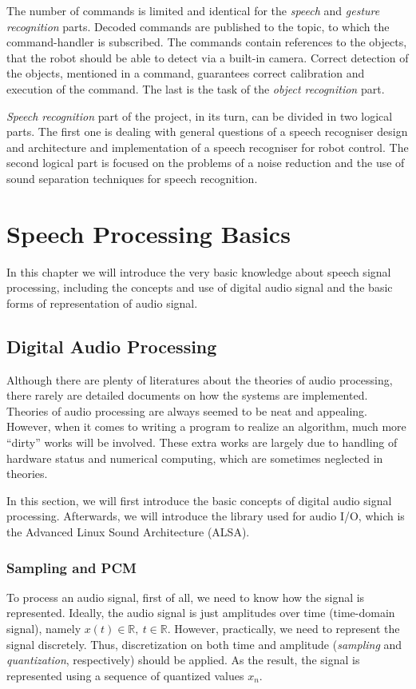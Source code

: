 \documentclass[11pt,a4paper]{report}
\begin{document}
 
The number of commands is limited and identical for the \textit
{speech} and \textit {gesture recognition} parts. Decoded commands are published
to the topic, to which the command-handler is subscribed.  The commands 
contain references to the objects, that the robot should be able to detect via
a built-in camera. Correct detection of the objects, mentioned in a command,
guarantees correct calibration and execution of the command. The last is the task of the \textit {object recognition} part. 

 \textit {Speech recognition} part of the project, in its turn,
can be divided in two logical parts. The first one is dealing with general questions of
a speech recogniser design and architecture and implementation of a speech
recogniser for robot control. The second logical part is focused on the
problems of a noise reduction and the use of sound separation techniques for
speech recognition. 


\chapter{Speech Processing Basics}
In this chapter we will introduce the very basic knowledge about speech signal processing, including the concepts and use of digital audio signal and the basic forms of representation of audio signal.

\section{Digital Audio Processing}
Although there are plenty of literatures about the theories of audio processing, there rarely are detailed documents on how the systems are implemented. Theories of audio processing are always seemed to be neat and appealing. However, when it comes to writing a program to realize an algorithm, much more ``dirty'' works will be involved. These extra works are largely due to handling of hardware status and numerical computing, which are sometimes neglected in theories.

In this section, we will first introduce the basic concepts of digital audio signal processing. Afterwards, we will introduce the library used for audio I/O, which is the Advanced Linux Sound Architecture (ALSA).

\subsection{Sampling and PCM}
To process an audio signal, first of all, we need to know how the signal is represented. Ideally, the audio signal is just amplitudes over time (time-domain signal), namely $ x(t) \in \mathbb{R},~ t \in \mathbb{R} $. However, practically, we need to represent the signal discretely. Thus, discretization on both time and amplitude (\textit{sampling} and \textit{quantization}, respectively) should be applied. As the result, the signal is represented using a sequence of quantized values $x_n$.
\end{document}
